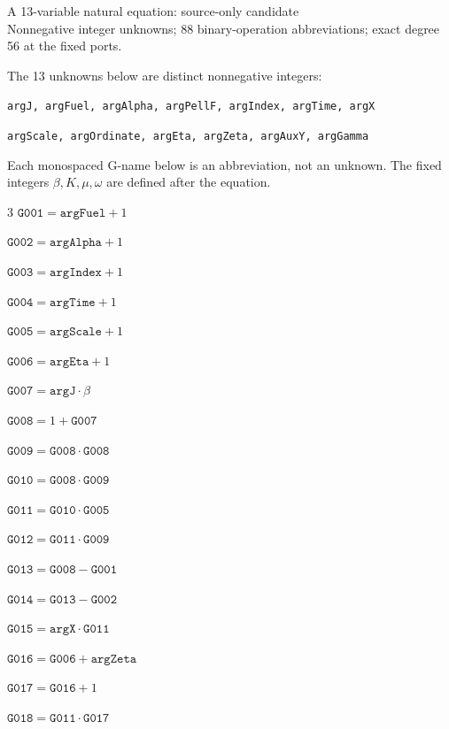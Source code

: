 \documentclass[10pt]{article}
\begin{document}
\begin{center}{\Large A 13-variable natural equation: source-only candidate}\\
Nonnegative integer unknowns; 88 binary-operation abbreviations; exact degree 56 at the fixed ports.
\end{center}
The 13 unknowns below are distinct nonnegative integers:
\par\small
\noindent\texttt{argJ, argFuel, argAlpha, argPellF, argIndex, argTime, argX}\par
\noindent\texttt{argScale, argOrdinate, argEta, argZeta, argAuxY, argGamma}\par
\normalsize
Each monospaced G-name below is an abbreviation, not an unknown. The fixed integers $\beta,K,\mu,\omega$ are defined after the equation.
\begin{multicols}{3}\small
\noindent $\mathtt{G001}=\mathtt{argFuel}+1$\par
\noindent $\mathtt{G002}=\mathtt{argAlpha}+1$\par
\noindent $\mathtt{G003}=\mathtt{argIndex}+1$\par
\noindent $\mathtt{G004}=\mathtt{argTime}+1$\par
\noindent $\mathtt{G005}=\mathtt{argScale}+1$\par
\noindent $\mathtt{G006}=\mathtt{argEta}+1$\par
\noindent $\mathtt{G007}=\mathtt{argJ}\cdot \beta$\par
\noindent $\mathtt{G008}=1+\mathtt{G007}$\par
\noindent $\mathtt{G009}=\mathtt{G008}\cdot \mathtt{G008}$\par
\noindent $\mathtt{G010}=\mathtt{G008}\cdot \mathtt{G009}$\par
\noindent $\mathtt{G011}=\mathtt{G010}\cdot \mathtt{G005}$\par
\noindent $\mathtt{G012}=\mathtt{G011}\cdot \mathtt{G009}$\par
\noindent $\mathtt{G013}=\mathtt{G008}-\mathtt{G001}$\par
\noindent $\mathtt{G014}=\mathtt{G013}-\mathtt{G002}$\par
\noindent $\mathtt{G015}=\mathtt{argX}\cdot \mathtt{G011}$\par
\noindent $\mathtt{G016}=\mathtt{G006}+\mathtt{argZeta}$\par
\noindent $\mathtt{G017}=\mathtt{G016}+1$\par
\noindent $\mathtt{G018}=\mathtt{G011}\cdot \mathtt{G017}$\par

\end{multicols}
\end{document}
